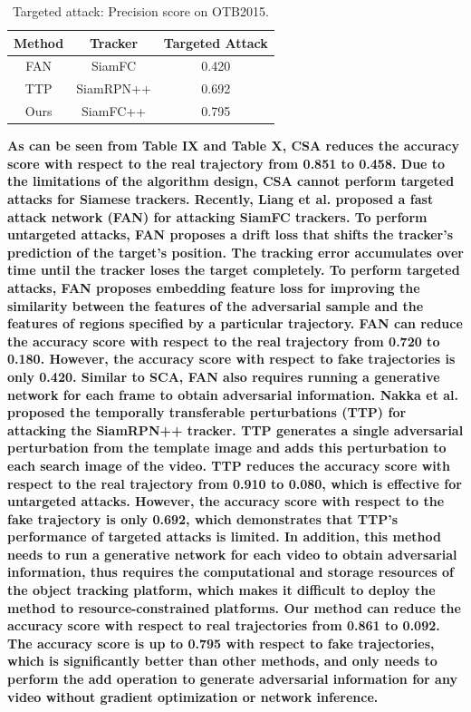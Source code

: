 \documentclass[12pt]{article}
\begin{document}
\begin{table}[h]
    \renewcommand\thetable{X} 
    \centering
    \caption{Targeted attack: Precision score on OTB2015.}
    \begin{tabular}{@{}ccc@{}}
    \toprule
    Method & Tracker &  Targeted Attack \\
    \midrule
    FAN & SiamFC  &0.420 \\
    TTP & SiamRPN++ &0.692 \\
    \midrule
    Ours & SiamFC++  &0.795 \\ \bottomrule
    \end{tabular}
    \label{tab:targeted}
\end{table}

\textbf{
As can be seen from Table IX and Table X, CSA reduces the accuracy score with respect to the real trajectory from 0.851 to 0.458. Due to the limitations of the algorithm design, CSA cannot perform targeted attacks for Siamese trackers. Recently, Liang et al. proposed a fast attack network (FAN) \cite{FAN} for attacking SiamFC trackers. To perform untargeted attacks, FAN proposes a drift loss that shifts the tracker's prediction of the target's position. The tracking error accumulates over time until the tracker loses the target completely. To perform targeted attacks, FAN proposes embedding feature loss for improving the similarity between the features of the adversarial sample and the features of regions specified by a particular trajectory. FAN can reduce the accuracy score with respect to the real trajectory from 0.720 to 0.180. However, the accuracy score with respect to fake trajectories is only 0.420. Similar to SCA, FAN also requires running a generative network for each frame to obtain adversarial information. Nakka et al. \cite{TTP} proposed the temporally transferable perturbations (TTP) for attacking the SiamRPN++ tracker. TTP generates a single adversarial perturbation from the template image and adds this perturbation to each search image of the video. TTP reduces the accuracy score with respect to the real trajectory from 0.910 to 0.080, which is effective for untargeted attacks. However, the accuracy score with respect to the fake trajectory is only 0.692, which demonstrates that TTP's performance of targeted attacks is limited. In addition, this method needs to run a generative network for each video to obtain adversarial information, thus requires the computational and storage resources of the object tracking platform, which makes it difficult to deploy the method to resource-constrained platforms. Our method can reduce the accuracy score with respect to real trajectories from 0.861 to 0.092. The accuracy score is up to 0.795 with respect to fake trajectories, which is significantly better than other methods, and only needs to perform the add operation to generate adversarial information for any video without gradient optimization or network inference.
}
\end{document}
